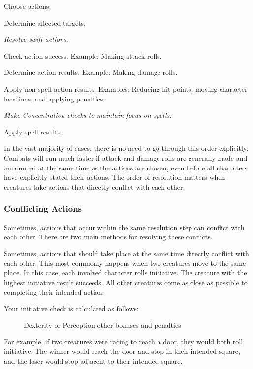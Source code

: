 \begin{enumerate*}
    \item Choose actions.
    \item Determine affected targets.
    \item \textit{Resolve swift actions}.
    \item Check action success.
        Example: Making attack rolls.
    \item Determine action results.
        Example: Making damage rolls.
    \item Apply non-spell action results.
        Examples: Reducing hit points, moving character locations, and applying penalties.
    \item \textit{Make Concentration checks to maintain focus on spells}.
    \item Apply spell results.
\end{enumerate*}

In the vast majority of cases, there is no need to go through this order explicitly.
Combats will run much faster if attack and damage rolls are generally made and announced at the same time as the actions are chosen, even before all characters have explicitly stated their actions.
The order of resolution matters when creatures take actions that directly conflict with each other.

\subsubsection{Conflicting Actions}\label{Conflicting Actions}

Sometimes, actions that occur within the same resolution step can conflict with each other.
There are two main methods for resolving these conflicts.

 Sometimes, actions that should take place at the same time directly conflict with each other.
This most commonly happens when two creatures move to the same place.
In this case, each involved character rolls initiative.
The creature with the highest initiative result succeeds.
All other creatures come as close as possible to completing their intended action.

Your initiative check is calculated as follows:

\begin{figure}[h]
    \centering Dexterity or Perception \add other bonuses and penalties
\end{figure}

For example, if two creatures were racing to reach a door, they would both roll initiative.
The winner would reach the door and stop in their intended square, and the loser would stop adjacent to their intended square.


